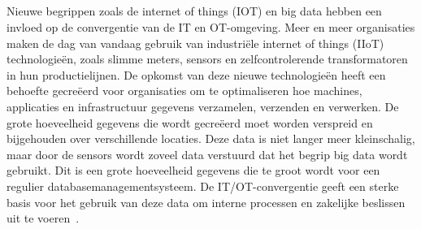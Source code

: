 \subsection{}
\label{sec:Nieuwe begrippen leiden tot de convergentie}
Nieuwe begrippen zoals de internet of things (IOT) en big data hebben een invloed op de convergentie van de IT en OT-omgeving. Meer en meer organisaties maken de dag van vandaag gebruik van industriële internet of things (IIoT) technologieën, zoals slimme meters, sensors en zelfcontrolerende transformatoren in hun productielijnen. De opkomst van deze nieuwe technologieën heeft een behoefte gecreëerd voor organisaties om te optimaliseren hoe machines, applicaties en infrastructuur gegevens verzamelen, verzenden en verwerken. De grote hoeveelheid gegevens die wordt gecreëerd moet worden verspreid en bijgehouden over verschillende locaties. Deze data is niet langer meer kleinschalig, maar door de sensors wordt zoveel data verstuurd dat het begrip big data wordt gebruikt. Dit is een grote hoeveelheid gegevens die te groot wordt voor een regulier databasemanagementsysteem. De IT/OT-convergentie geeft een sterke basis voor het gebruik van deze data om interne processen en zakelijke beslissen uit te voeren~\autocite{Tiempo2020}.

